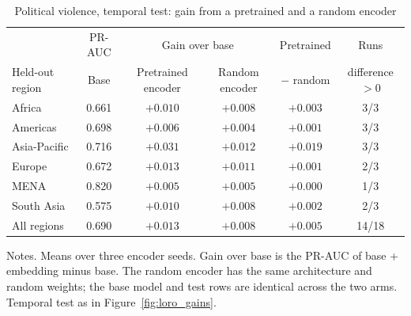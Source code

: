 \begin{table}[!htbp]
\centering\footnotesize\setlength{\tabcolsep}{5pt}
\caption{Political violence, temporal test: gain from a pretrained and a random encoder}
\label{tab:random_temporal}
\begin{tabular}{lccccc}
\hline
 & PR-AUC & \multicolumn{2}{c}{Gain over base} & Pretrained & Runs \\
Held-out region & Base & Pretrained encoder & Random encoder & $-$ random & difference $>0$ \\
\hline
Africa & 0.661 & $+0.010$ & $+0.008$ & $+0.003$ & 3/3 \\
Americas & 0.698 & $+0.006$ & $+0.004$ & $+0.001$ & 3/3 \\
Asia-Pacific & 0.716 & $+0.031$ & $+0.012$ & $+0.019$ & 3/3 \\
Europe & 0.672 & $+0.013$ & $+0.011$ & $+0.001$ & 2/3 \\
MENA & 0.820 & $+0.005$ & $+0.005$ & $+0.000$ & 1/3 \\
South Asia & 0.575 & $+0.010$ & $+0.008$ & $+0.002$ & 2/3 \\
\hline
All regions & 0.690 & $+0.013$ & $+0.008$ & $+0.005$ & 14/18 \\
\hline
\end{tabular}
\begin{minipage}{0.98\textwidth}\footnotesize\vspace{0.5ex}
Notes. Means over three encoder seeds. Gain over base is the PR-AUC of base + embedding minus base. The random encoder has the same architecture and random weights; the base model and test rows are identical across the two arms. Temporal test as in Figure~\ref{fig:loro_gains}.
\end{minipage}
\end{table}
